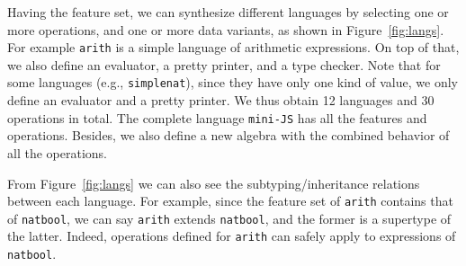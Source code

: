 Having the feature set, we can synthesize different languages by selecting one or
more operations, and one or more data variants, as shown in
Figure~\ref{fig:langs}. For example \lstinline{arith} is a simple language of
arithmetic expressions. On top of that, we also define an evaluator, a pretty
printer, and a type checker. Note that for some languages (e.g.,
\lstinline{simplenat}), since they have only one kind of value, we only define an
evaluator and a pretty printer. We thus obtain 12 languages and 30 operations in
total. The complete language \lstinline{mini-JS} has all the features and
operations. Besides, we also define a new algebra with the combined behavior of
all the operations.


From Figure~\ref{fig:langs} we can also see the subtyping/inheritance relations
between each language. For example, since the feature set of \lstinline{arith}
contains that of \lstinline{natbool}, we can say \lstinline{arith} extends
\lstinline{natbool}, and the former is a supertype of the latter. Indeed,
operations defined for \lstinline{arith} can safely apply to expressions of \lstinline{natbool}.



